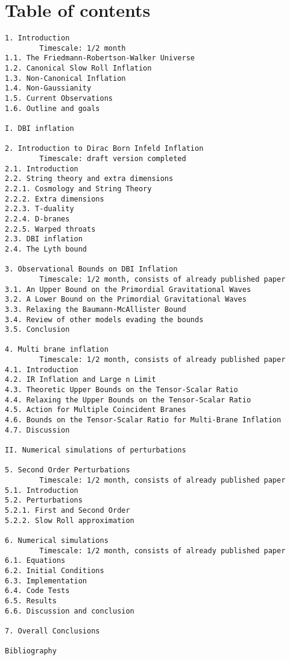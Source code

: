 \documentclass[a4paper,11pt]{article}
\begin{document}
\section*{Table of contents}
\begin{verbatim}
1. Introduction
        Timescale: 1/2 month
1.1. The Friedmann-Robertson-Walker Universe
1.2. Canonical Slow Roll Inflation
1.3. Non-Canonical Inflation
1.4. Non-Gaussianity
1.5. Current Observations
1.6. Outline and goals

I. DBI inflation

2. Introduction to Dirac Born Infeld Inflation
        Timescale: draft version completed
2.1. Introduction
2.2. String theory and extra dimensions
2.2.1. Cosmology and String Theory
2.2.2. Extra dimensions
2.2.3. T-duality
2.2.4. D-branes
2.2.5. Warped throats
2.3. DBI inflation
2.4. The Lyth bound

3. Observational Bounds on DBI Inflation
        Timescale: 1/2 month, consists of already published paper
3.1. An Upper Bound on the Primordial Gravitational Waves
3.2. A Lower Bound on the Primordial Gravitational Waves
3.3. Relaxing the Baumann-McAllister Bound
3.4. Review of other models evading the bounds 
3.5. Conclusion

4. Multi brane inflation
        Timescale: 1/2 month, consists of already published paper
4.1. Introduction
4.2. IR Inflation and Large n Limit
4.3. Theoretic Upper Bounds on the Tensor-Scalar Ratio
4.4. Relaxing the Upper Bounds on the Tensor-Scalar Ratio
4.5. Action for Multiple Coincident Branes
4.6. Bounds on the Tensor-Scalar Ratio for Multi-Brane Inflation
4.7. Discussion

II. Numerical simulations of perturbations

5. Second Order Perturbations
        Timescale: 1/2 month, consists of already published paper
5.1. Introduction
5.2. Perturbations
5.2.1. First and Second Order
5.2.2. Slow Roll approximation

6. Numerical simulations
        Timescale: 1/2 month, consists of already published paper
6.1. Equations
6.2. Initial Conditions
6.3. Implementation
6.4. Code Tests
6.5. Results
6.6. Discussion and conclusion

7. Overall Conclusions

Bibliography
\end{verbatim}
\end{document}
